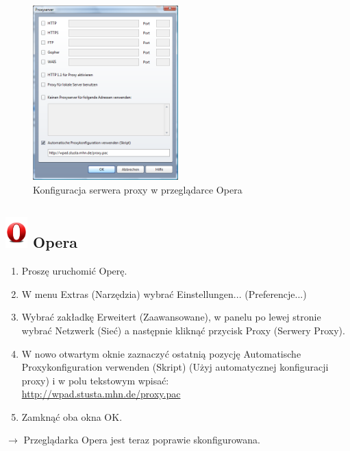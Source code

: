 \documentclass[a4paper,12pt]{scrartcl}
\begin{document}
\newpage
\begin{figure}
  \begin{center}
    \includegraphics[width=0.5\textwidth,keepaspectratio]{Bilder/Proxy_Opera}
  \end{center}
  \caption{Konfiguracja serwera proxy w przeglądarce Opera}
\end{figure}

\subsection*{\includegraphics[height=1.2cm,keepaspectratio]{Bilder/Opera_O} Opera}
\begin{enumerate}
    \item Proszę uruchomić Operę.
    \item W menu Extras (Narzędzia) wybrać Einstellungen... (Preferencje...)
    \item Wybrać zakładkę Erweitert (Zaawansowane), w panelu po lewej stronie wybrać Netzwerk (Sieć) a następnie kliknąć przycisk Proxy (Serwery Proxy).
    \item W nowo otwartym oknie zaznaczyć ostatnią pozycję Automatische Proxykonfiguration verwenden (Skript) (Użyj automatycznej konfiguracji proxy) i w polu tekstowym wpisać:\\ \url{http://wpad.stusta.mhn.de/proxy.pac}
    \item Zamknąć oba okna OK.
\end{enumerate}
$\rightarrow$ Przeglądarka Opera jest teraz poprawie skonfigurowana.
\end{document}
